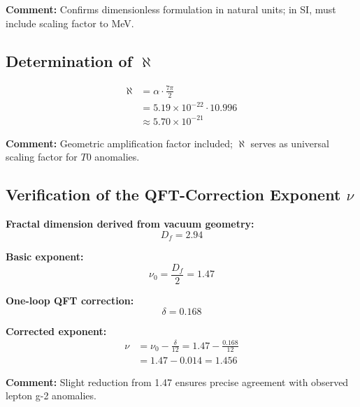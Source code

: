 \documentclass[12pt,a4paper]{article}
\newcommand{\alphagem}{\alpha}      %
\newcommand{\nulep}{\nu}            %
\begin{document}
\textbf{Comment:} Confirms dimensionless formulation in natural units; in SI, must include scaling factor to MeV.

\subsection{Determination of $\aleph$}

\begin{align}
	\aleph &= \alphagem \cdot \frac{7\pi}{2} \\
	&= 5.19 \times 10^{-22} \cdot 10.996 \\
	&\approx 5.70 \times 10^{-21}
\end{align}

\textbf{Comment:} Geometric amplification factor included; $\aleph$ serves as universal scaling factor for $T0$ anomalies.

\subsection{Verification of the QFT-Correction Exponent $\nulep$}

\textbf{Fractal dimension derived from vacuum geometry:}
\begin{equation}
	D_f = 2.94
\end{equation}

\textbf{Basic exponent:}
\begin{equation}
	\nulep_0 = \frac{D_f}{2} = 1.47
\end{equation}

\textbf{One-loop QFT correction:}
\begin{equation}
	\delta = 0.168
\end{equation}

\textbf{Corrected exponent:}
\begin{align}
	\nulep &= \nulep_0 - \frac{\delta}{12} = 1.47 - \frac{0.168}{12} \\
	&= 1.47 - 0.014 = 1.456
\end{align}

\textbf{Comment:} Slight reduction from 1.47 ensures precise agreement with observed lepton g-2 anomalies.

\end{document}
